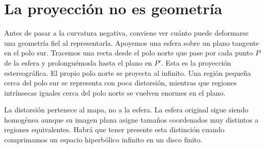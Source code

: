 \begin{classroomqa}\end{classroomqa}

\section{La proyección no es geometría}

Antes de pasar a la curvatura negativa, conviene ver cuánto puede deformarse una geometría fiel al representarla. Apoyemos una esfera sobre un plano tangente en el polo sur. Tracemos una recta desde el polo norte que pase por cada punto \(P\) de la esfera y prolonguémosla hasta el plano en \(P'\). Esta es la proyección estereográfica. El propio polo norte se proyecta al infinito. Una región pequeña cerca del polo sur se representa con poca distorsión, mientras que regiones intrínsecas iguales cerca del polo norte se vuelven enormes en el plano.

La distorsión pertenece al mapa, no a la esfera. La esfera original sigue siendo homogénea aunque su imagen plana asigne tamaños coordenados muy distintos a regiones equivalentes. Habrá que tener presente esta distinción cuando comprimamos un espacio hiperbólico infinito en un disco finito.

